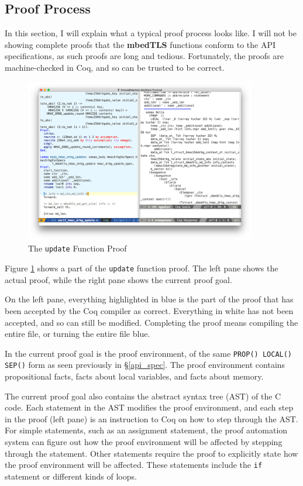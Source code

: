 \documentclass[pageno]{jpaper}
\newcommand{\stdtitle}[1]{\textbf{#1}}
\begin{document}
\subsection{Proof Process}

In this section, I will explain what a typical proof process looks like. I will not be showing complete proofs that the \stdtitle{mbedTLS} functions conform to the API specifications, as such proofs are long and tedious. Fortunately, the proofs are machine-checked in Coq, and so can be trusted to be correct.
\begin{figure}[h]
\centering
\includegraphics[width=0.9\textwidth]{before_forward}
\caption{The \lstinline{update} Function Proof}
\label{figure:before_forward}
\end{figure}

Figure \ref{figure:before_forward} shows a part of the \lstinline{update} function proof. The left pane shows the actual proof, while the right pane shows the current proof goal.

On the left pane, everything highlighted in blue is the part of the proof that has been accepted by the Coq compiler as correct. Everything in white has not been accepted, and so can still be modified. Completing the proof means compiling the entire file, or turning the entire file blue.

In the current proof goal is the proof environment, of the same \lstinline{PROP() LOCAL() SEP()} form as seen previously in \S \ref{api_spec}. The proof environment contains propositional facts, facts about local variables, and facts about memory.

The current proof goal also contains the abstract syntax tree (AST) of the C code. Each statement in the AST modifies the proof environment, and each step in the proof (left pane) is an instruction to Coq on how to step through the AST. For simple statements, such as an assignment statement, the proof automation system can figure out how the proof environment will be affected by stepping through the statement. Other statements require the proof to explicitly state how the proof environment will be affected. These statements include the \lstinline{if} statement or different kinds of loops.
\end{document}
